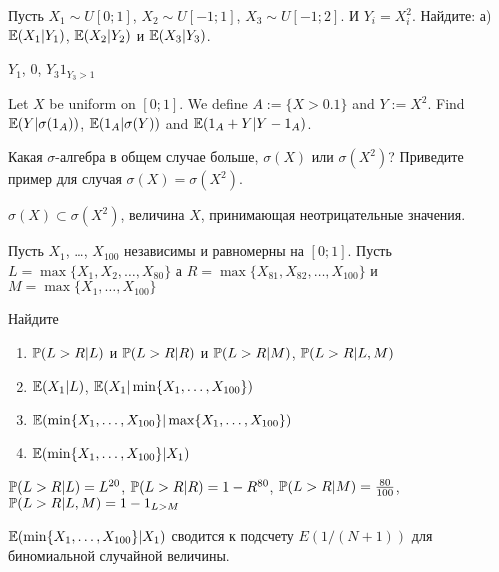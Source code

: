 \begin{problem}
Пусть $X_{1}\sim U[0;1]$, $X_{2}\sim U[-1;1]$, $X_{3}\sim U[-1;2]$. И $Y_{i}=X_{i}^{2}$. Найдите: а) $ \E(X_{1}|Y_{1}) $, $ \E(X_{2}|Y_{2}) $ и $ \E(X_{3}|Y_{3}) $.

\begin{sol}
 $Y_{1}$, $0$, $Y_{3}1_{Y_{3}>1}$
\end{sol}
\end{problem}

\begin{problem}
Let $ X $ be uniform on $[0;1]$. We define $ A:=\{X>0.1\} $ and $ Y:=X^{2} $. Find $ \E(Y|\sigma(1_{A})) $, $\E(1_{A}|\sigma(Y))$ and $\E(1_{A}+Y|Y-1_{A})$.

\begin{sol}

\end{sol}
\end{problem}

\begin{problem}
Какая $\sigma$-алгебра в общем случае больше, $\sigma(X)$ или $\sigma(X^2)$? Приведите пример для случая $\sigma(X)=\sigma(X^2)$.

\begin{sol}
$\sigma(X) \subset \sigma(X^2)$, величина $X$, принимающая неотрицательные значения.
\end{sol}
\end{problem}

\begin{problem}
Пусть $ X_{1} $, \ldots, $ X_{100} $ независимы и равномерны на $ [0;1] $. Пусть $ L=\max\{X_{1},X_{2},\ldots, X_{80}\} $ а $ R=\max\{X_{81},X_{82},\ldots,X_{100}\} $ и $ M=\max\{X_{1},\ldots,X_{100}\} $

Найдите
\begin{enumerate}
\item $ \P(L>R|L)$ и $ \P(L>R|R) $ и $ \P(L>R|M)$, $\P(L>R|L,M) $
\item $\E( X_1 | L )$, $\E( X_1 | \min \{ X_1, \ldots, X_{100} \})$
\item $\E( \min \{ X_1, \ldots, X_{100} \} | \max \{ X_1, \ldots, X_{100} \})$
\item $\E(\min \{ X_1, \ldots, X_{100} \} | X_1)$
\end{enumerate}


\begin{sol}
$ \P(L>R|L)=L^{20}$,  $ \P(L>R|R)=1-R^{80} $, $ \P(L>R|M)=\frac{80}{100}$, $\P(L>R|L,M)=1-1_{L>M} $

$\E(\min \{ X_1, \ldots, X_{100} \} | X_1)$ сводится к подсчету $E(1/(N+1))$ для биномиальной случайной величины.
\end{sol}
\end{problem}

